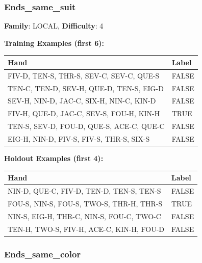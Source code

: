 \documentclass[10pt,a4paper]{article}
\begin{document}
\vspace{0.5cm}

\subsubsection{Ends\_same\_suit}

\textbf{Family}: LOCAL, \textbf{Difficulty}: 4

\textbf{Training Examples (first 6):}

\begin{small}
\begin{tabular}{p{8cm}l}
\toprule
Hand & Label \\
\midrule
FIV-D, TEN-S, THR-S, SEV-C, SEV-C, QUE-S & \textcolor{negative}{FALSE} \\
TEN-C, TEN-D, SEV-H, QUE-D, TEN-S, EIG-D & \textcolor{negative}{FALSE} \\
SEV-H, NIN-D, JAC-C, SIX-H, NIN-C, KIN-D & \textcolor{negative}{FALSE} \\
FIV-H, QUE-D, JAC-C, SEV-S, FOU-H, KIN-H & \textcolor{positive}{TRUE} \\
TEN-S, SEV-D, FOU-D, QUE-S, ACE-C, QUE-C & \textcolor{negative}{FALSE} \\
EIG-H, NIN-D, FIV-S, FIV-S, THR-S, SIX-S & \textcolor{negative}{FALSE} \\
\bottomrule
\end{tabular}
\end{small}

\textbf{Holdout Examples (first 4):}

\begin{small}
\begin{tabular}{p{8cm}l}
\toprule
Hand & Label \\
\midrule
NIN-D, QUE-C, FIV-D, TEN-D, TEN-S, TEN-S & \textcolor{negative}{FALSE} \\
FOU-S, NIN-S, FOU-S, TWO-S, THR-H, THR-S & \textcolor{positive}{TRUE} \\
NIN-S, EIG-H, THR-C, NIN-S, FOU-C, TWO-C & \textcolor{negative}{FALSE} \\
TEN-H, TWO-S, FIV-H, ACE-C, KIN-H, FOU-D & \textcolor{negative}{FALSE} \\
\bottomrule
\end{tabular}
\end{small}

\vspace{0.5cm}

\subsubsection{Ends\_same\_color}
\end{document}
